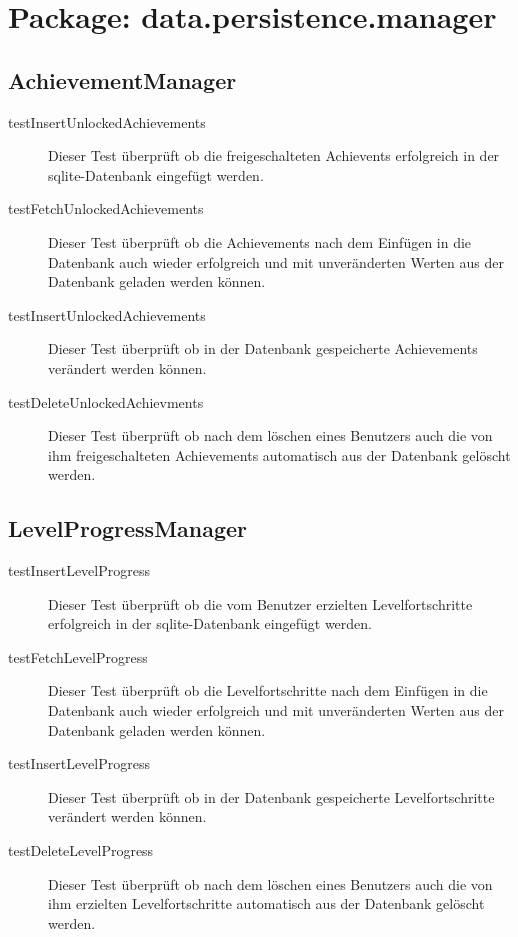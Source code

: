 \section{Package: data.persistence.manager}

\subsection{AchievementManager}

\begin{description}

\item[testInsertUnlockedAchievements]
Dieser Test überprüft ob die freigeschalteten Achievents erfolgreich in der sqlite-Datenbank eingefügt werden. 

\item[testFetchUnlockedAchievements]
Dieser Test überprüft ob die Achievements nach dem Einfügen in die Datenbank auch wieder erfolgreich und mit unveränderten Werten aus der Datenbank geladen werden können.

\item[testInsertUnlockedAchievements]
Dieser Test überprüft ob in der Datenbank gespeicherte Achievements verändert werden können.

\item[testDeleteUnlockedAchievments]
Dieser Test überprüft ob nach dem löschen eines Benutzers auch die von ihm freigeschalteten Achievements automatisch aus der Datenbank gelöscht werden.

\end{description}

\subsection{LevelProgressManager}

\begin{description}

\item[testInsertLevelProgress]
Dieser Test überprüft ob die vom Benutzer erzielten Levelfortschritte erfolgreich in der sqlite-Datenbank eingefügt werden. 

\item[testFetchLevelProgress]
Dieser Test überprüft ob die Levelfortschritte nach dem Einfügen in die Datenbank auch wieder erfolgreich und mit unveränderten Werten aus der Datenbank geladen werden können.

\item[testInsertLevelProgress]
Dieser Test überprüft ob in der Datenbank gespeicherte Levelfortschritte verändert werden können.

\item[testDeleteLevelProgress]
Dieser Test überprüft ob nach dem löschen eines Benutzers auch die von ihm erzielten Levelfortschritte automatisch aus der Datenbank gelöscht werden.

\end{description}

